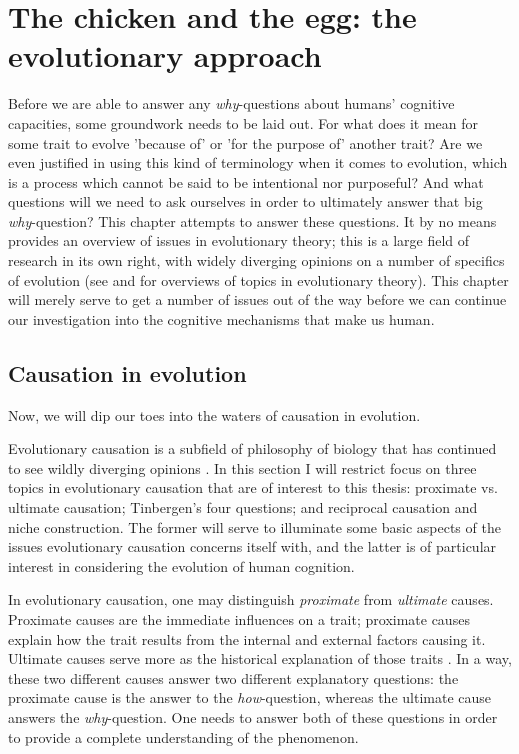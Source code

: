 \chapter{The chicken and the egg: the evolutionary approach}


Before we are able to answer any \emph{why}-questions about humans' cognitive capacities, some groundwork needs to be laid out. For what does it mean for some trait to evolve 'because of' or 'for the purpose of' another trait? Are we even justified in using this kind of terminology when it comes to evolution, which is a process which cannot be said to be intentional nor purposeful? And what questions will we need to ask ourselves in order to ultimately answer that big  \emph{why}-question?
This chapter attempts to answer these questions. It by no means provides an overview of issues in evolutionary theory; this is a large field of research in its own right, with widely diverging opinions on a number of specifics of evolution (see \citet{Ariew02} and \citet{UllerLaland19} for overviews of topics in evolutionary theory).
This chapter will merely serve to get a number of issues out of the way before we can continue our investigation into the cognitive mechanisms that make us human.

\section{Causation in evolution}
\label{sec:causation-evolution}

Now, we will dip our toes into the waters of causation in evolution.

Evolutionary causation is a subfield of philosophy of biology that has continued to see wildly diverging opinions \citep{Baedke2021, UllerLaland19}. In this section I will restrict focus on three topics in evolutionary causation that are of interest to this thesis: proximate vs. ultimate causation; Tinbergen's four questions; and reciprocal causation and niche construction.
The former will serve to illuminate some basic aspects of the issues evolutionary causation concerns itself with, and the latter is of particular interest in considering the evolution of human cognition.

In evolutionary causation, one may distinguish \emph{proximate} from \emph{ultimate} causes.
Proximate causes are the immediate influences on a trait; proximate causes explain how the trait results from the internal and external factors causing it.
Ultimate causes serve more as the historical explanation of those traits \citep{Mayr61}. In a way, these two different causes answer two different explanatory questions: the proximate cause is the answer to the \emph{how}-question, whereas the ultimate cause answers the \emph{why}-question. One needs to answer both of these questions in order to provide a complete understanding of the phenomenon.

